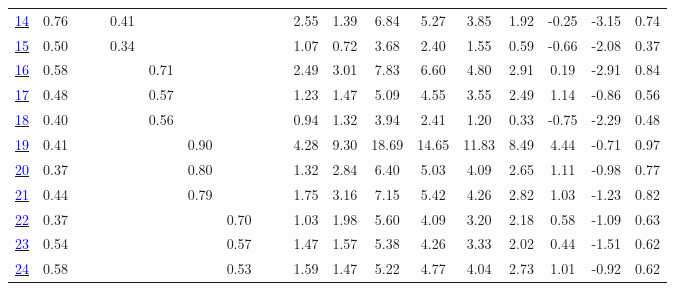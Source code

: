 \documentclass[
  man,floatsintext]{apa7}
\newenvironment{lltable}{\begin{landscape}\centering\begin{ThreePartTable}}{\end{ThreePartTable}\end{landscape}}
\begin{document}
\begin{lltable}
{\begin{longtable}{ccccccccccccccccccc}
\label{zukun_2_347}\hyperref[zukun_2_347]{\textcolor{blue}{14}} & \cellcolor{lightgray} 0.76 &  &  & 0.41 &  &  &  &  &  & 2.55 & 1.39 & 6.84 & 5.27 & 3.85 & 1.92 & -0.25 & -3.15 & 0.74\\
\label{zukun_2_344}\hyperref[zukun_2_344]{\textcolor{blue}{15}} & \cellcolor{lightgray} 0.50 &  &  & 0.34 &  &  &  &  &  & 1.07 & 0.72 & 3.68 & 2.40 & 1.55 & 0.59 & -0.66 & -2.08 & 0.37\\
\label{humor_1_082}\hyperref[humor_1_082]{\textcolor{blue}{16}} & \cellcolor{lightgray} 0.58 &  &  &  & \cellcolor{lightgray} 0.71 &  &  &  &  & 2.49 & 3.01 & 7.83 & 6.60 & 4.80 & 2.91 & 0.19 & -2.91 & 0.84\\
\label{humor_1_087}\hyperref[humor_1_087]{\textcolor{blue}{17}} & 0.48 &  &  &  & \cellcolor{lightgray} 0.57 &  &  &  &  & 1.23 & 1.47 & 5.09 & 4.55 & 3.55 & 2.49 & 1.14 & -0.86 & 0.56\\
\label{humor_1_085_r}\hyperref[humor_1_085_r]{\textcolor{blue}{18}} & 0.40 &  &  &  & \cellcolor{lightgray} 0.56 &  &  &  &  & 0.94 & 1.32 & 3.94 & 2.41 & 1.20 & 0.33 & -0.75 & -2.29 & 0.48\\
\label{famil_1_373}\hyperref[famil_1_373]{\textcolor{blue}{19}} & 0.41 &  &  &  &  & \cellcolor{lightgray} 0.90 &  &  &  & 4.28 & 9.30 & 18.69 & 14.65 & 11.83 & 8.49 & 4.44 & -0.71 & 0.97\\
\label{famil_1_371}\hyperref[famil_1_371]{\textcolor{blue}{20}} & 0.37 &  &  &  &  & \cellcolor{lightgray} 0.80 &  &  &  & 1.32 & 2.84 & 6.40 & 5.03 & 4.09 & 2.65 & 1.11 & -0.98 & 0.77\\
\label{famil_1_378}\hyperref[famil_1_378]{\textcolor{blue}{21}} & 0.44 &  &  &  &  & \cellcolor{lightgray} 0.79 &  &  &  & 1.75 & 3.16 & 7.15 & 5.42 & 4.26 & 2.82 & 1.03 & -1.23 & 0.82\\
\label{sozia_1_355}\hyperref[sozia_1_355]{\textcolor{blue}{22}} & 0.37 &  &  &  &  &  & \cellcolor{lightgray} 0.70 &  &  & 1.03 & 1.98 & 5.60 & 4.09 & 3.20 & 2.18 & 0.58 & -1.09 & 0.63\\
\label{sozia_1_038}\hyperref[sozia_1_038]{\textcolor{blue}{23}} & \cellcolor{lightgray} 0.54 &  &  &  &  &  & \cellcolor{lightgray} 0.57 &  &  & 1.47 & 1.57 & 5.38 & 4.26 & 3.33 & 2.02 & 0.44 & -1.51 & 0.62\\
\label{sozia_1_354}\hyperref[sozia_1_354]{\textcolor{blue}{24}} & \cellcolor{lightgray} 0.58 &  &  &  &  &  & \cellcolor{lightgray} 0.53 &  &  & 1.59 & 1.47 & 5.22 & 4.77 & 4.04 & 2.73 & 1.01 & -0.92 & 0.62\\

\end{longtable}}
\end{lltable}
\end{document}
